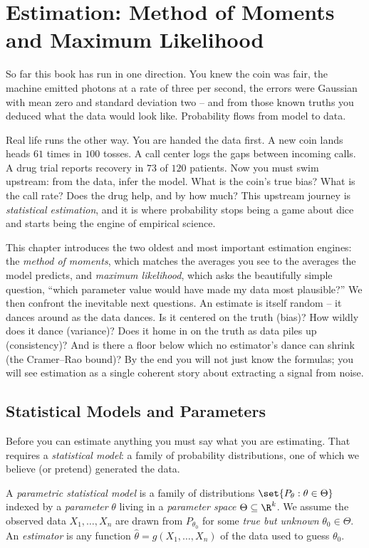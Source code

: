 \chapter{Estimation: Method of Moments and Maximum Likelihood}

So far this book has run in one direction. You knew the coin was fair, the
machine emitted photons at a rate of three per second, the errors were Gaussian
with mean zero and standard deviation two -- and from those known truths you
deduced what the data would look like. Probability flows from model to data.

Real life runs the other way. You are handed the data first. A new coin lands
heads $61$ times in $100$ tosses. A call center logs the gaps between incoming
calls. A drug trial reports recovery in $73$ of $120$ patients. Now you must
swim upstream: from the data, infer the model. What is the coin's true bias?
What is the call rate? Does the drug help, and by how much? This upstream
journey is \emph{statistical estimation}, and it is where probability stops
being a game about dice and starts being the engine of empirical science.

This chapter introduces the two oldest and most important estimation engines:
the \emph{method of moments}, which matches the averages you see to the
averages the model predicts, and \emph{maximum likelihood}, which asks the
beautifully simple question, ``which parameter value would have made my data
most plausible?'' We then confront the inevitable next questions. An estimate
is itself random -- it dances around as the data dances. Is it centered on the
truth (bias)? How wildly does it dance (variance)? Does it home in on the
truth as data piles up (consistency)? And is there a floor below which no
estimator's dance can shrink (the Cramer--Rao bound)? By the end you will not
just know the formulas; you will see estimation as a single coherent story
about extracting a signal from noise.

\chapterline

\section{Statistical Models and Parameters}
\label{ch30:models}

Before you can estimate anything you must say what you are estimating. That
requires a \emph{statistical model}: a family of probability distributions, one
of which we believe (or pretend) generated the data.

\begin{definition}
\label{ch30:def-model}
A \emph{parametric statistical model} is a family of distributions
$\set{P_\theta : \theta \in \Theta}$ indexed by a \emph{parameter} $\theta$
living in a \emph{parameter space} $\Theta \subseteq \R^k$. We assume the
observed data $X_1,\dots,X_n$ are drawn from $P_{\theta_0}$ for some
\emph{true but unknown} $\theta_0 \in \Theta$. An \emph{estimator} is any
function $\hat\theta = g(X_1,\dots,X_n)$ of the data used to guess $\theta_0$.
\end{definition}


